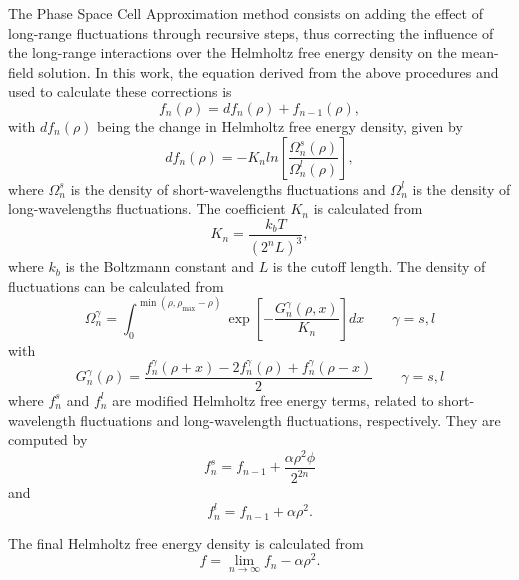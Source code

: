\documentclass[preprint,12pt,3p]{elsarticle}
\begin{document}
The Phase Space Cell Approximation method consists on adding the effect of long-range fluctuations through recursive steps, thus correcting the influence of the long-range interactions over the Helmholtz free energy density on the mean-field solution.
In this work, the equation derived from the above procedures and used to calculate these corrections is
\begin{equation} \label{eq:fn}
f_{n}(\rho) = df_{n}(\rho) + f_{n-1}(\rho),
\end{equation}
with $df_{n}(\rho)$ being the change in Helmholtz free energy density, given by
\begin{equation} \label{eq:dfn}
df_{n}(\rho) = -K_{n} ln\left[\frac{\Omega_{n}^{s}(\rho)}{\Omega_{n}^{l}(\rho)}\right],
\end{equation}
where $\Omega_{n}^{s}$ is the density of short-wavelengths fluctuations and $\Omega_{n}^{l}$ is the density of long-wavelengths fluctuations.
The coefficient $K_{n}$ is calculated from
\begin{equation} \label{eq:Kn}
K_{n} = \frac{k_{b}T}{(2^{n}L)^3},
\end{equation}
where $k_{b}$ is the Boltzmann constant and $L$ is the cutoff length.
The density of fluctuations can be calculated from
\begin{equation} \label{eq:Omega}
\Omega_{n}^{\gamma} = \int_{0}^{\min(\rho,\rho_{\max}-\rho)}\exp\left[-\frac{G_{n}^{\gamma}(\rho,x)}{K_{n}}\right]dx \qquad  \gamma = s,l
\end{equation}
with
\begin{equation} \label{eq:Gn}
G_{n}^{\gamma}(\rho) = \frac{f_{n}^{\gamma}(\rho+x)-2f_{n}^{\gamma}(\rho)+f_{n}^{\gamma}(\rho-x)}{2} \qquad \gamma = s,l
\end{equation}
where $f_{n}^{s}$ and $f_{n}^{l}$ are modified Helmholtz free energy terms, related to short-wavelength fluctuations and long-wavelength fluctuations, respectively.
They are computed by
\begin{equation} \label{eq:fns}
f_{n}^{s} = f_{n-1} + \frac{\alpha \rho^2 \phi}{2^{2n}}
\end{equation}
and
\begin{equation} \label{eq:fnl}
f_{n}^{l} = f_{n-1} + \alpha\rho^2.
\end{equation}

The final Helmholtz free energy density is calculated from
\begin{equation} \label{eq:ff}
f = \lim_{n \rightarrow \infty} f_{n} - \alpha\rho^2.
\end{equation}
  
\end{document}
